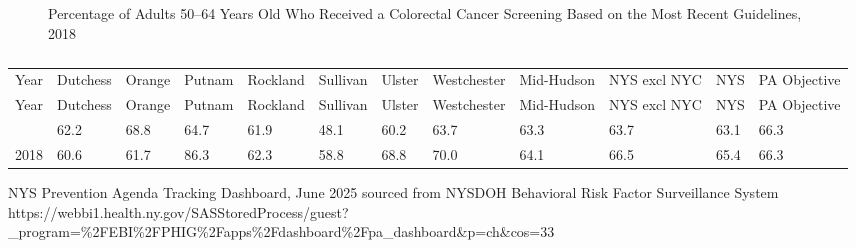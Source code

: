 \documentclass[
  english,
  letterpaper,
]{report}
\begin{document}
\begin{figure}


\caption{\label{fig-adult-50to64-colorectalca-screening-percent}Percentage
of Adults 50--64 Years Old Who Received a Colorectal Cancer Screening
Based on the Most Recent Guidelines, 2018}

\end{figure}%

\begin{longtable}[]{@{}llllllllllll@{}}

\caption{\label{tbl-adult-50to64-colorectalca-screening-percent}Percentage
of Adults 50--64 Years Old Who Received a Colorectal Cancer Screening
Based on the Most Recent Guidelines, 2018}

\tabularnewline

\caption{}\label{T_4bf7c}\tabularnewline
\toprule\noalign{}
Year & Dutchess & Orange & Putnam & Rockland & Sullivan & Ulster &
Westchester & Mid-Hudson & NYS excl NYC & NYS & PA Objective \\
\midrule\noalign{}
\endfirsthead
\toprule\noalign{}
Year & Dutchess & Orange & Putnam & Rockland & Sullivan & Ulster &
Westchester & Mid-Hudson & NYS excl NYC & NYS & PA Objective \\
\midrule\noalign{}
\endhead
\bottomrule\noalign{}
\endlastfoot
2016 & 62.2 & 68.8 & 64.7 & 61.9 & 48.1 & 60.2 & 63.7 & 63.3 & 63.7 &
63.1 & 66.3 \\
2018 & 60.6 & 61.7 & 86.3 & 62.3 & 58.8 & 68.8 & 70.0 & 64.1 & 66.5 &
65.4 & 66.3 \\

\end{longtable}

\begin{tcolorbox}[enhanced jigsaw, breakable, leftrule=.75mm, title=\textcolor{quarto-callout-note-color}{\faInfo}\hspace{0.5em}{Source}, bottomrule=.15mm, opacityback=0, left=2mm, colback=white, bottomtitle=1mm, coltitle=black, colbacktitle=quarto-callout-note-color!10!white, colframe=quarto-callout-note-color-frame, opacitybacktitle=0.6, toptitle=1mm, titlerule=0mm, arc=.35mm, rightrule=.15mm, toprule=.15mm]

NYS Prevention Agenda Tracking Dashboard, June 2025 sourced from NYSDOH
Behavioral Risk Factor Surveillance System
https://webbi1.health.ny.gov/SASStoredProcess/guest?\_program=\%2FEBI\%2FPHIG\%2Fapps\%2Fdashboard\%2Fpa\_dashboard\&p=ch\&cos=33

\end{tcolorbox}
\end{document}
